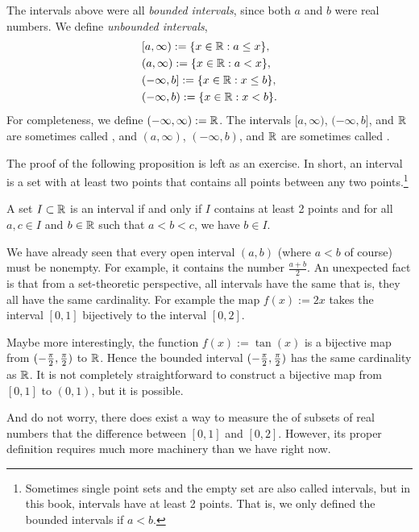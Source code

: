 The intervals above were all \emph{bounded intervals}, since both $a$ and $b$ were real numbers.  We 
define \emph{unbounded intervals},
\begin{align*}
& [a,\infty) := \{ x \in \R : a \leq x \}, \\
& (a,\infty) := \{ x \in \R : a < x \}, \\
& (-\infty,b] := \{ x \in \R : x \leq b \}, \\
& (-\infty,b) := \{ x \in \R : x < b \} .
\end{align*}
For completeness, we define $(-\infty,\infty) := \R$.
The intervals $[a,\infty)$, $(-\infty,b]$, and $\R$ are sometimes called
\emph{},
and $(a,\infty)$, $(-\infty,b)$, and $\R$ are sometimes called
\emph{}.

The proof of the following proposition is left as an exercise.
In short, an interval is a set with at least two points
that contains all points between any two
points.\footnote{Sometimes single point sets and the empty set are
also called intervals, but in this book, intervals have at least 2 points.
That is, we only defined the bounded intervals if $a < b$.}

\begin{prop} \label{prop:intervaldef}
A set $I \subset \R$ is an interval if and only if
$I$ contains at least 2 points and
for all $a,c \in I$ and $b \in \R$ such that $a < b < c$, we have $b \in I$.
\end{prop}

We have already seen that every open interval $(a,b)$ (where $a < b$ of course)
must be nonempty.  For example, it contains the number $\frac{a+b}{2}$.
An unexpected fact is that from a set-theoretic perspective,
all intervals have the same  that is, they all have
the same cardinality.  For example the map $f(x) := 2x$
takes the interval $[0,1]$ bijectively to the interval $[0,2]$.

Maybe more interestingly,
the function $f(x) := \tan(x)$
is a bijective map from $(-\nicefrac{\pi}{2},\nicefrac{\pi}{2})$ to $\R$.  Hence the bounded
interval $(-\nicefrac{\pi}{2},\nicefrac{\pi}{2})$ has the same cardinality as $\R$.  It is not
completely straightforward to construct a bijective map from $[0,1]$ to
$(0,1)$, but it is possible.

And do not worry, there does exist a way to measure the  of subsets
of real numbers that
the difference between $[0,1]$ and $[0,2]$.  However, its proper definition
requires much more machinery than we have right now.

